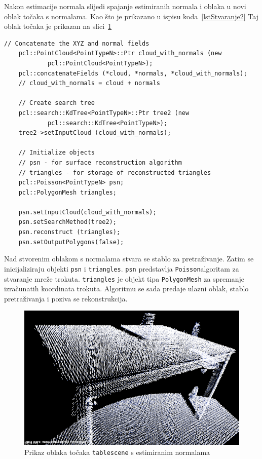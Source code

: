 Nakon estimacije normala slijedi spajanje estimiranih normala i oblaka u
novi oblak točaka s normalama. Kao što je prikazano u ispisu
koda~\ref{lstStvaranje2} Taj oblak točaka je prikazan na 
slici~\ref{fig:tablescene-normals}

\newpage
\begin{lstlisting}[label=lstStvaranje2,caption={Dio izvornog koda iz
funkcije \texttt{reconstruct\_mesh()} }]
    // Concatenate the XYZ and normal fields
    pcl::PointCloud<PointTypeN>::Ptr cloud_with_normals (new
            pcl::PointCloud<PointTypeN>);
    pcl::concatenateFields (*cloud, *normals, *cloud_with_normals);
    // cloud_with_normals = cloud + normals

    // Create search tree 
    pcl::search::KdTree<PointTypeN>::Ptr tree2 (new
            pcl::search::KdTree<PointTypeN>);
    tree2->setInputCloud (cloud_with_normals);

    // Initialize objects 
    // psn - for surface reconstruction algorithm
    // triangles - for storage of reconstructed triangles
    pcl::Poisson<PointTypeN> psn;
    pcl::PolygonMesh triangles;

    psn.setInputCloud(cloud_with_normals);
    psn.setSearchMethod(tree2);
    psn.reconstruct (triangles);
    psn.setOutputPolygons(false);
\end{lstlisting}

Nad stvorenim oblakom s normalama stvara se stablo za pretraživanje.
Zatim se inicijaliziraju objekti \texttt{psn} i \texttt{triangles}.
\texttt{psn} predstavlja \texttt{Poisson}\footnotemark[5] algoritam za
stvaranje mreže trokuta. \texttt{triangles} je objekt tipa
\texttt{PolygonMesh} za spremanje izračunatih koordinata trokuta.
Algoritmu se sada predaje ulazni oblak, stablo pretraživanja i poziva se
rekonstrukcija.


\begin{figure}[h]
\centering
\includegraphics[scale=0.5]{figures/tablescene-normals.png}
\caption{Prikaz oblaka točaka \texttt{tablescene} s estimiranim
normalama }
\label{fig:tablescene-normals}
\end{figure}

